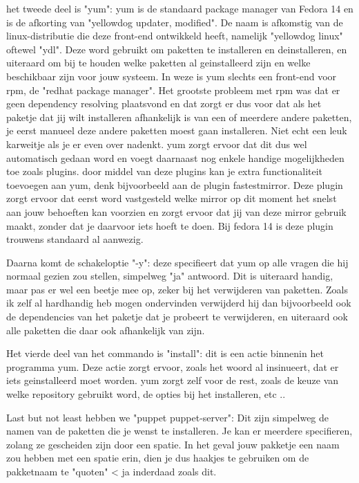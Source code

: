 het tweede deel is "yum": yum is de standaard package manager van Fedora 14 en is de afkorting van "yellowdog updater, modified". De naam is afkomstig van de linux-distributie die deze front-end ontwikkeld heeft, namelijk "yellowdog linux" oftewel "ydl". Deze word gebruikt om paketten te installeren en deinstalleren, en uiteraard om bij te houden welke paketten al geinstalleerd zijn en welke beschikbaar zijn voor jouw systeem. In weze is yum slechts een front-end voor rpm, de "redhat package manager". Het grootste probleem met rpm was dat er geen dependency resolving plaatsvond en dat zorgt er dus voor dat als het paketje dat jij wilt installeren afhankelijk is van een of meerdere andere paketten, je eerst manueel deze andere paketten moest gaan installeren. Niet  echt een leuk karweitje als je er even over nadenkt. yum zorgt ervoor dat dit dus wel automatisch gedaan word en voegt daarnaast nog enkele handige mogelijkheden toe zoals plugins. door middel van deze plugins kan je extra functionaliteit toevoegen aan yum, denk bijvoorbeeld aan de plugin fastestmirror. Deze plugin zorgt ervoor dat eerst word vastgesteld welke mirror op dit moment het snelst aan jouw behoeften kan voorzien en zorgt ervoor dat jij van deze mirror gebruik maakt, zonder dat je daarvoor iets hoeft te doen. Bij fedora 14 is deze plugin trouwens standaard al aanwezig.

Daarna komt de schakeloptie "-y": deze specifieert dat yum op alle vragen die hij normaal gezien zou stellen, simpelweg "ja" antwoord. Dit is uiteraard handig, maar pas er wel een beetje mee op, zeker bij het verwijderen van paketten. Zoals ik zelf al hardhandig heb mogen ondervinden verwijderd hij dan bijvoorbeeld ook de dependencies van het paketje dat je probeert te verwijderen, en uiteraard ook alle paketten die daar ook afhankelijk van zijn. 

Het vierde deel van het commando is "install": dit is een actie binnenin het programma yum. Deze actie zorgt ervoor, zoals het woord al insinueert, dat er iets geinstalleerd moet worden. yum zorgt zelf voor de rest, zoals de keuze van welke repository gebruikt word, de opties bij het installeren, etc ..

Last but not least hebben we "puppet puppet-server": Dit zijn simpelweg de namen van de paketten die je wenst te installeren. Je kan er meerdere specifieren, zolang ze gescheiden zijn door een spatie. In het geval jouw pakketje een naam zou hebben met een spatie erin, dien je dus haakjes te gebruiken om de pakketnaam te "quoten" < ja inderdaad zoals dit.

